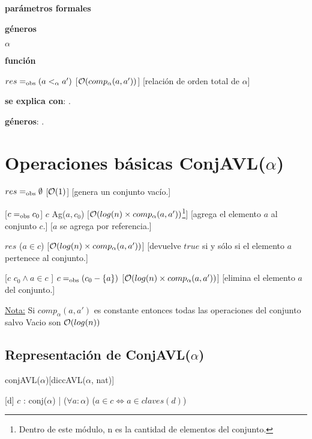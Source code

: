 \begin{Interfaz}
  \textbf{parámetros formales}\parindent\\
  \parbox{1.7cm}{\textbf{géneros}} $\alpha$\\
    \parbox[t]{1.7cm}{\textbf{función}}\parbox[t]{\textwidth-2\parindent-1.7cm}{    	
    {$res =_{\mathrm{obs}} (a <_{\alpha} a')$}
    [$\mathcal{O}(comp_{\alpha}(a, a'))$]
    [relación de orden total de $\alpha$]
    }	
	
  \textbf{se explica con}: .

  \textbf{géneros}: .

  \section*{Operaciones básicas ConjAVL($\alpha$)}

  {$res =_{\mathrm{obs}} \emptyset$}
  [$\mathcal{O}(1)$]
  [genera un conjunto vacío.]

  [$c =_{\mathrm{obs}} c_0$]  
  {$c$ \igobs Ag($a,c_0$)}
  [$\mathcal{O}(log(n) \times comp_{\alpha}(a, a'))$\footnote{Dentro de este módulo, n es la cantidad de elementos del conjunto.}]
  [agrega el elemento $a$ al conjunto $c$.]
  [$a$ se agrega por referencia.]
    
  {$res$ \igobs ($a\in c$) }
  [$\mathcal{O}(log(n) \times comp_{\alpha}(a, a'))$]
  [devuelve $true$ si y sólo si el elemento $a$ pertenece al conjunto.]
  
  [$c$ \igobs $c_0 \land a \in c$ ]
  {$c =_{\mathrm{obs}} (c_0 - \{a\})$}
  [$\mathcal{O}(log(n) \times comp_{\alpha}(a, a'))$]
  [elimina el elemento $a$ del conjunto.] 
  
  \underline{Nota:} Si $comp_{\alpha}(a, a')$ es constante entonces todas las operaciones del conjunto salvo Vacio son $\mathcal{O}(log(n))$
  \newpage
\end{Interfaz}

\begin{Representacion}
    
  \section*{Representación de ConjAVL($\alpha$)}

  \begin{Estructura}{conjAVL($\alpha$)}[diccAVL($\alpha$, nat)]
  \end{Estructura}
  
  
  [d]{
	$c$ : conj($\alpha$) | ($\forall a: \alpha$) ($a\in c \Leftrightarrow a\in claves(d)$)}
\end{Representacion}


